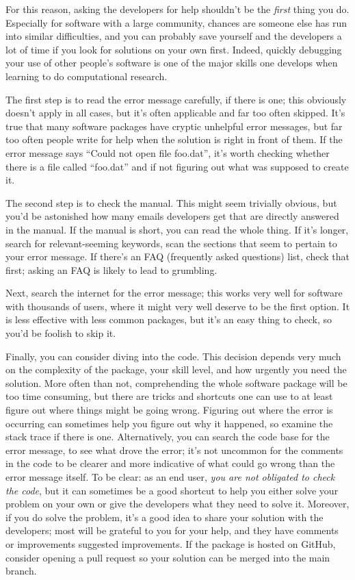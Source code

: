\documentclass[9pt,training]{livecoms}
\begin{document}
For this reason, asking the developers for help shouldn't be the \emph{first}
thing you do. Especially for software with a large community, chances are
someone else has run into similar difficulties, and you can probably save
yourself and the developers a lot of time if you look for solutions on your own
first. Indeed, quickly debugging your use of other people's software is one of
the major skills one develops when learning to do computational research.

The first step is to read the error message carefully, if there is one; this
obviously doesn't apply in all cases, but it's often applicable and far too
often skipped. It's true that many software packages have cryptic unhelpful
error messages, but far too often people write for help when the solution is
right in front of them. If the error message says ``Could not open file
foo.dat'', it's worth checking whether there is a file called ``foo.dat'' and if
not figuring out what was supposed to create it.

The second step is to check the manual. This might seem trivially obvious, but
you'd be astonished how many emails developers get that are directly answered in
the manual. If the manual is short, you can read the whole thing. If it's
longer, search for relevant-seeming keywords, scan the sections that seem to
pertain to your error message. If there's an FAQ (frequently asked questions)
list, check that first; asking an FAQ is likely to lead to grumbling.

Next, search the internet for the error message; this works very well for
software with thousands of users, where it might very well deserve to be the
first option. It is less effective with less common packages, but it's an easy
thing to check, so you'd be foolish to skip it.

Finally, you can consider diving into the code. This decision depends very much
on the complexity of the package, your skill level, and how urgently you need
the solution. More often than not, comprehending the whole software package will
be too time consuming, but there are tricks and shortcuts one can use to at
least figure out where things might be going wrong. Figuring out where the error
is occurring can sometimes help you figure out why it happened, so examine the
stack trace if there is one. Alternatively, you can search the code base for the
error message, to see what drove the error; it's not uncommon for the comments
in the code to be clearer and more indicative of what could go wrong than the
error message itself. To be clear: as an end user, \emph{you are not obligated
to check the code}, but it can sometimes be a good shortcut to help you either
solve your problem on your own or give the developers what they need to solve
it. Moreover, if you do solve the problem, it's a good idea to share your
solution with the developers; most will be grateful to you for your help, and
they have comments or improvements suggested improvements. If the package is
hosted on GitHub, consider opening a pull request so your solution can be merged
into the main branch.
\end{document}
